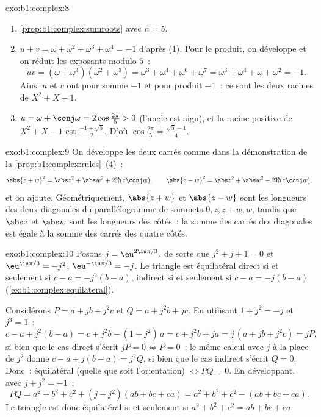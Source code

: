 \begin{solution}{exo:b1:complex:8}
\begin{enumerate}
  \item \cref{prop:b1:complex:sumroots} avec $n = 5$.
  \item $u + v = \omega + \omega^2 + \omega^3 + \omega^4 = -1$ d'après
        (1). Pour le produit, on développe et on réduit les exposants
        modulo $5$~:
        \[
        uv = (\omega + \omega^4)(\omega^2 + \omega^3)
        = \omega^3 + \omega^4 + \omega^6 + \omega^7
        = \omega^3 + \omega^4 + \omega + \omega^2 = -1 .
        \]
        Ainsi $u$ et $v$ ont pour somme $-1$ et pour produit $-1$~: ce
        sont les deux racines de $X^2 + X - 1$.
  \item $u = \omega + \conj\omega = 2\cos\frac{2\pi}{5} > 0$ (l'angle
        est aigu), et la racine positive de $X^2 + X - 1$ est
        $\frac{-1 + \sqrt 5}{2}$. D'où $\cos\frac{2\pi}{5} =
        \frac{\sqrt 5 - 1}{4}$.
\end{enumerate}
\end{solution}

\begin{solution}{exo:b1:complex:9}
On développe les deux carrés comme dans la démonstration de la
\cref{prop:b1:complex:rules}~(4)~:
\[
\abs{z + w}^2 = \abs z^2 + \abs w^2 + 2\Re(z\conj w),
\qquad
\abs{z - w}^2 = \abs z^2 + \abs w^2 - 2\Re(z\conj w),
\]
et on ajoute. Géométriquement, $\abs{z+w}$ et $\abs{z-w}$ sont les
longueurs des deux diagonales du parallélogramme de sommets $0, z,
z+w, w$, tandis que $\abs z$ et $\abs w$ sont les longueurs des côtés~:
la somme des carrés des diagonales est égale à la somme des carrés des
quatre côtés.
\end{solution}

\begin{solution}{exo:b1:complex:10}
Posons $j = \eu^{2\iu\pi/3}$, de sorte que $j^2 + j + 1 = 0$ et
$\eu^{\iu\pi/3} = -j^2$, $\eu^{-\iu\pi/3} = -j$. Le triangle est
équilatéral direct si et seulement si $c - a = -j^2 (b - a)$, indirect
si et seulement si $c - a = -j(b - a)$
(\cref{ex:b1:complex:equilateral}).

Considérons $P = a + jb + j^2 c$ et $Q = a + j^2 b + jc$. En utilisant
$1 + j^2 = -j$ et $j^3 = 1$~:
\[
c - a + j^2(b - a) = c + j^2 b - (1 + j^2)\,a = c + j^2 b + ja
= j\,(a + jb + j^2 c) = jP,
\]
si bien que le cas direct s'écrit $jP = 0 \iff P = 0$~; le même calcul
avec $j$ à la place de $j^2$ donne $c - a + j(b - a) = j^2 Q$, si bien
que le cas indirect s'écrit $Q = 0$. Donc~: équilatéral (quelle que
soit l'orientation) $\iff PQ = 0$. En développant, avec $j + j^2 =
-1$~:
\[
PQ = a^2 + b^2 + c^2 + (j + j^2)(ab + bc + ca)
= a^2 + b^2 + c^2 - (ab + bc + ca).
\]
Le triangle est donc équilatéral si et seulement si $a^2 + b^2 + c^2 =
ab + bc + ca$.
\end{solution}

